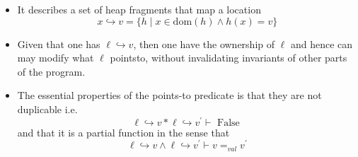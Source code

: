 \begin{itemize}
  \begin{itemize}
  	\item It describes a set of heap fragments that map a location 
    \begin{equation*}
      x \hookrightarrow v = \{h \mid x \in \text{dom}(h) \land h(x) = v\}
    \end{equation*}
    \item Given that one has $\ell \hookrightarrow v$, then one have the ownership of $\ell$ and hence can may modify what $\ell$ pointsto, without invalidating invariants of other parts of the program.
    \item The essential properties of the points-to predicate is that they are not duplicable i.e.
    \begin{equation*}
      \ell \hookrightarrow v * \ell \hookrightarrow v^{\prime} \vdash \text { False }
    \end{equation*}
    and that it is a partial function in the sense that
    \begin{equation*}
      \ell \hookrightarrow v \wedge \ell \hookrightarrow v^{\prime} \vdash v=_{v a l} v^{\prime}
    \end{equation*}	
  \end{itemize}
\end{itemize}

